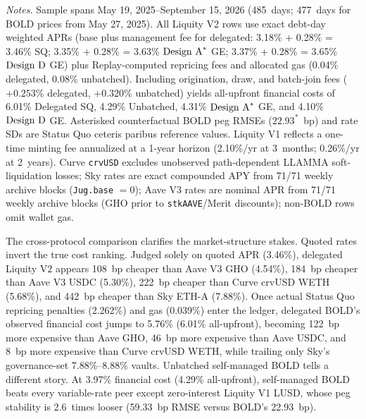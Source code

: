 \begin{table}[!htbp]
\par\vspace{4pt}\begin{minipage}{\textwidth}\footnotesize\setlength{\parskip}{0pt}\textit{Notes.} Sample spans May 19, 2025--September 15, 2026 (485~days; 477~days for BOLD prices from May 27, 2025). All Liquity V2 rows use exact debt-day weighted APRs (base plus management fee for delegated: 3.18\% + 0.28\% = 3.46\% SQ; 3.35\% + 0.28\% = 3.63\% $\text{Design A}^*$ GE; 3.37\% + 0.28\% = 3.65\% $\text{Design D}$ GE) plus Replay-computed repricing fees and allocated gas (0.04\% delegated, 0.08\% unbatched). Including origination, draw, and batch-join fees ($+0.253\%$ delegated, $+0.320\%$ unbatched) yields all-upfront financial costs of 6.01\% Delegated SQ, 4.29\% Unbatched, 4.31\% $\text{Design A}^*$ GE, and 4.10\% $\text{Design D}$ GE. Asterisked counterfactual BOLD peg RMSEs ($22.93^*$~bp) and rate SDs are Status Quo ceteris paribus reference values. Liquity V1 reflects a one-time minting fee annualized at a 1-year horizon (2.10\%/yr at 3~months; 0.26\%/yr at 2~years). Curve \texttt{crvUSD} excludes unobserved path-dependent LLAMMA soft-liquidation losses; Sky rates are exact compounded APY from 71/71 weekly archive blocks (\texttt{Jug.base} $= 0$); Aave V3 rates are nominal APR from 71/71 weekly archive blocks (GHO prior to \texttt{stkAAVE}/Merit discounts); non-BOLD rows omit wallet gas.
\end{minipage}
\end{table}

The cross-protocol comparison clarifies the market-structure stakes. Quoted rates invert the true cost ranking. Judged solely on quoted APR (3.46\%), delegated Liquity V2 appears 108~bp cheaper than Aave V3 GHO (4.54\%), 184~bp cheaper than Aave V3 USDC (5.30\%), 222~bp cheaper than Curve crvUSD WETH (5.68\%), and 442~bp cheaper than Sky ETH-A (7.88\%). Once actual Status Quo repricing penalties (2.262\%) and gas (0.039\%) enter the ledger, delegated BOLD's observed financial cost jumps to 5.76\% (6.01\% all-upfront), becoming 122~bp more expensive than Aave GHO, 46~bp more expensive than Aave USDC, and 8~bp more expensive than Curve crvUSD WETH, while trailing only Sky's governance-set 7.88\%--8.88\% vaults. Unbatched self-managed BOLD tells a different story. At 3.97\% financial cost (4.29\% all-upfront), self-managed BOLD beats every variable-rate peer except zero-interest Liquity V1 LUSD, whose peg stability is 2.6~times looser (59.33~bp RMSE versus BOLD's 22.93~bp).

